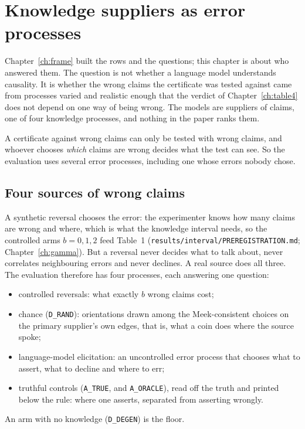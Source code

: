\chapter{Knowledge suppliers as error processes}\label{ch:suppliers}

Chapter~\ref{ch:frame} built the rows and the questions; this chapter is about who answered them.
The question is not whether a language model understands causality. It is whether the wrong claims the
certificate was tested against came from processes varied and realistic enough that the verdict of
Chapter~\ref{ch:table4} does not depend on one way of being wrong. The models are suppliers of claims,
one of four knowledge processes, and nothing in the paper ranks them.

\begin{ideia}
A certificate against wrong claims can only be tested with wrong claims, and whoever chooses
\emph{which} claims are wrong decides what the test can see. So the evaluation uses several error
processes, including one whose errors nobody chose.
\end{ideia}

\begin{antes}
\end{antes}

\section{Four sources of wrong claims}\label{sec:sup-sources}

A synthetic reversal chooses the error: the experimenter knows how many claims are wrong and where,
which is what the knowledge interval needs, so the controlled arms $b = 0, 1, 2$ feed Table~1
(\texttt{results/interval/PREREGISTRATION.md}; Chapter~\ref{ch:gamma}). But a reversal never decides
what to talk about, never correlates neighbouring errors and never declines. A real source does all
three. The evaluation therefore has four processes, each answering one question:
\begin{itemize}[nosep, leftmargin=*]
\item controlled reversals: what exactly $b$ wrong claims cost;
\item chance (\texttt{D\_RAND}): orientations drawn among the Meek-consistent choices on the
  primary supplier's own edges, that is, what a coin does where the source spoke;
\item language-model elicitation: an uncontrolled error process that chooses what to assert,
  what to decline and where to err;
\item truthful controls (\texttt{A\_TRUE}, and \texttt{A\_ORACLE}), read off the truth and
  printed below the rule: where one asserts, separated from asserting wrongly.
\end{itemize}
An arm with no knowledge (\texttt{D\_DEGEN}) is the floor.

